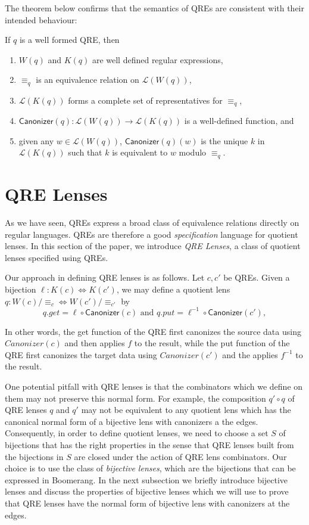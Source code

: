 \documentclass{svproc}
\newcommand{\kw}[1]{\ensuremath{\mathsf{#1}}}
\newcommand{\canonizer}{\ensuremath{\kw{Canonizer}}}
\newcommand{\eqrel}[1]{\ensuremath{\equiv_{#1}}}
\begin{document}
The theorem below confirms that the semantics of QREs are consistent with their
intended behaviour:
\begin{theorem}
If $q$ is a well formed QRE, then
\begin{enumerate}
  \item $W(q)$ and $K(q)$ are well defined regular expressions,
  \item  $\eqrel{q}$ is an equivalence relation on $\mathcal{L}(W(q))$,
  \item  $\mathcal{L}(K(q))$ forms a complete set of representatives for
  $\eqrel{q}$,
  \item $\canonizer(q):\mathcal{L}(W(q)) \longrightarrow \mathcal{L}(K(q))$ is a
  well-defined function, and
  \item  given any $w \in \mathcal{L}(W(q))$, $\canonizer(q)(w)$ is the unique
  $k$ in $\mathcal{L}(K(q))$ such that $k$ is equivalent to $w$ modulo
  $\eqrel{q}$.
  \end{enumerate}
\end{theorem}

\section{QRE Lenses}
\label{QRE-lenses} 
As we have seen, QREs express a broad class of equivalence relations
directly on regular languages.  QREs are therefore a good \textit{specification}
language for quotient lenses. In this section of the paper, we introduce
\textit{QRE Lenses}, a class of quotient lenses specified using QREs.

Our approach in defining QRE lenses is as follows. Let $c, c'$ be QREs. Given a
bijection $\ell : K(c) \Leftrightarrow K(c')$, we may define a quotient lens $q
: W(c)/\eqrel{c} \Leftrightarrow W(c')/\eqrel{c'}$ by
\begin{equation}\label{normalform}
q.get = \ell \circ \canonizer(c) \text{ and } q.put = \ell^{-1} \circ
\canonizer(c'),
\end{equation}

\noindent In other words, the get function of the QRE first canonizes the source
data using $\mathit{Canonizer}(c)$ and then applies $f$ to the result, while the
put function of the QRE first canonizes the target data using
$\mathit{Canonizer}(c')$ and the applies $f^{-1}$ to the result.

One potential pitfall with QRE lenses is that the combinators which
we define on them may not preserve this normal form. For example, the
composition $q' \circ q$ of QRE lenses $q$ and $q'$ may not be equivalent to
any quotient lens which has the canonical normal form of a bijective lens with
canonizers a the edges. Consequently, in order to define quotient lenses, we
need to choose a set $S$ of bijections that has the right properties in the
sense that QRE lenses built from the bijections in $S$ are closed under the
action of QRE lens combinators. Our choice is to use the class of
\textit{bijective lenses}, which are the bijections that can be expressed in
Boomerang. In the next subsection we briefly introduce bijective lenses and
discuss the properties of bijective lenses which we will use to prove that QRE
lenses have the normal form of bijective lens with canonizers at the edges.
\end{document}
